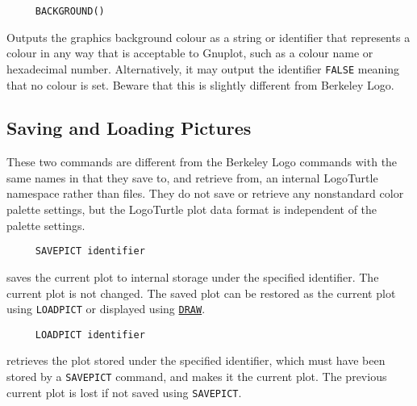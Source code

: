 



\begin{verbatim}
     BACKGROUND()
\end{verbatim}
Outputs the graphics background colour as a string or identifier that
represents a colour in any way that is acceptable to Gnuplot, such as
a colour name or hexadecimal number.  Alternatively, it may output the
identifier \texttt{FALSE} meaning that no colour is set.  Beware that
this is slightly different from Berkeley Logo.


\subsection{Saving and Loading Pictures}

These two commands are different from the Berkeley Logo commands with
the same names in that they save to, and retrieve from, an internal
LogoTurtle namespace rather than files.  They do not save or retrieve
any nonstandard color palette settings, but the LogoTurtle plot data
format is independent of the palette settings.

\begin{verbatim}
     SAVEPICT identifier
\end{verbatim}
\label{logoturtle:savepict}
saves the current plot to internal storage under the specified
identifier.  The current plot is not changed.  The saved plot can be
restored as the current plot using \texttt{LOADPICT} or displayed
using \hyperref[logoturtle:draw]{\texttt{DRAW}}.

\begin{verbatim}
     LOADPICT identifier
\end{verbatim}
retrieves the plot stored under the specified identifier, which must
have been stored by a \texttt{SAVEPICT} command, and makes it the
current plot.  The previous current plot is lost if not saved using
\texttt{SAVEPICT}.
